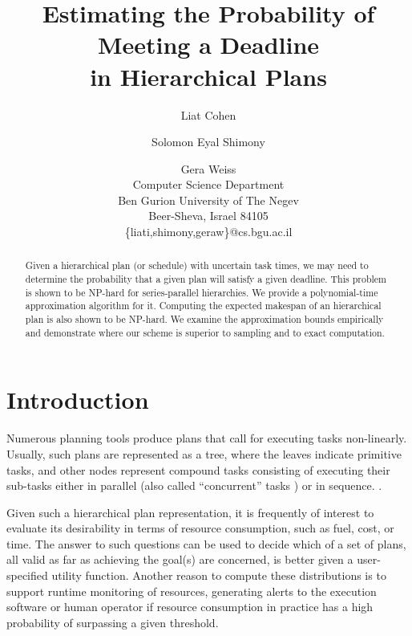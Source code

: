 \documentclass{article}
\begin{document}
\title{Estimating the Probability of Meeting a Deadline \\ in Hierarchical Plans}


\author{Liat Cohen \and Solomon Eyal Shimony \and Gera Weiss\\
Computer Science Department\\
Ben Gurion University of The Negev\\
Beer-Sheva, Israel 84105\\
\{liati,shimony,geraw\}@cs.bgu.ac.il
}



\maketitle

\begin{abstract}
Given a hierarchical plan (or schedule) with uncertain task times, we may need to determine
the probability that a given plan will satisfy a given deadline.
This problem is shown to be NP-hard for series-parallel hierarchies. We provide a polynomial-time approximation algorithm for it. 
Computing the expected makespan of an hierarchical plan is also shown to be NP-hard.
We examine the approximation bounds empirically and demonstrate 
where our scheme is superior to sampling and to exact computation.%

\end{abstract}  

\section{Introduction}

Numerous planning tools produce plans that call for executing tasks non-linearly.
Usually, such plans are represented as a tree, where the
leaves indicate primitive tasks, and other nodes represent compound tasks consisting of executing
their sub-tasks either in parallel (also called ``concurrent'' tasks \cite{gabaldon2002programming}) or in sequence.
\cite{erol1994htn,nau1998control,nau2003shop2,kelly2008offline}.

Given such a hierarchical plan representation, it is frequently of interest to evaluate its desirability in terms of
resource consumption, such as fuel, cost, or time. The answer to such questions can be used to
decide which of a set of plans, all valid as far as achieving the goal(s) are
concerned, is better given a user-specified utility function. Another reason to compute these
distributions is to support runtime monitoring of resources, generating alerts to the execution
software or human operator if resource consumption in practice
has a high probability of surpassing a given threshold.
\end{document}
